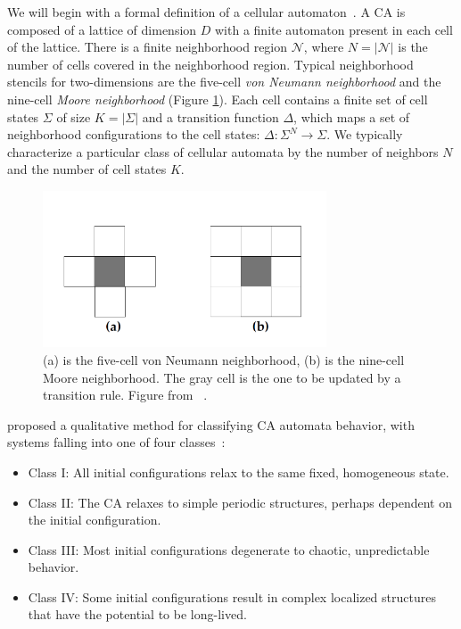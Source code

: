 \documentclass[a4paper,11pt]{report}
\begin{document}
\medskip

We will begin with a formal definition of a cellular automaton~\cite{la90}. A CA is composed of a lattice of dimension $D$ with a finite automaton present in each cell of the lattice. There is a finite neighborhood region $\mathcal{N}$, where $N = |\mathcal{N}|$ is the number of cells covered in the neighborhood region. Typical neighborhood stencils for two-dimensions are the five-cell \textit{von Neumann neighborhood} and the nine-cell \textit{Moore neighborhood} (Figure \ref{fig:neighborhoods}). Each cell contains a finite set of cell states $\Sigma$ of size $K = |\Sigma|$ and a transition function $\Delta$, which maps a set of neighborhood configurations to the cell states: $\Delta: \Sigma^N \to \Sigma$. We typically characterize a particular class of cellular automata by the number of neighbors $N$ and the number of cell states $K$. 

\begin{figure}[thp]
\centering
\includegraphics[width=0.75\textwidth]{mi96_fig3_neighborhoods}
\caption[CA Neighborhood Stencils]{
	(a) is the five-cell von Neumann neighborhood, (b) is the nine-cell Moore neighborhood. The gray cell is the one to be updated by a transition rule. Figure from \citeauthor{mi96}~\cite{mi96}.
}
\label{fig:neighborhoods}
\end{figure}

\medskip

\citeauthor{wf84} proposed a qualitative method for classifying CA automata behavior, with systems falling into one of four classes~\cite{mi96,wf84}:
\begin{itemize}[noitemsep, nolistsep]
\item Class I: All initial configurations relax to the same fixed, homogeneous state.
\item Class II: The CA relaxes to simple periodic structures, perhaps dependent on the initial configuration.
\item Class III: Most initial configurations degenerate to chaotic, unpredictable behavior.
\item Class IV: Some initial configurations result in complex localized structures that have the potential to be long-lived.
\end{itemize}
\end{document}
